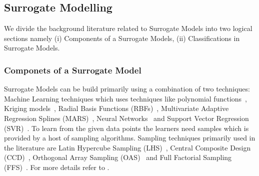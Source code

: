 \documentclass{newsig}
\begin{document}
\subsection{Surrogate Modelling}
We divide the background literature related to Surrogate Models into two logical sections namely (i) Components of a Surrogate Models, (ii) Classifications in Surrogate Models.

\subsubsection{Componets of a Surrogate Model}
Surrogate Models can be build primarily using a combination of two techniques: Machine Learning techniques which uses techniques like polynomial functions~\cite{madsen2000response}, Kriging models~\cite{kleijnen2009kriging}, Radial Basis Functions (RBFs)~\cite{buhmann2004radial}, Multivariate Adaptive Regression Splines (MARS)~\cite{friedman1991multivariate}, Neural Networks~\cite{hagan1996neural} and Support Vector Regression (SVR)~\cite{smola2004tutorial}. To learn from the given data points the learners need samples which is provided by a host of sampling algorithms. Sampling techniques primarily used in the literature are Latin Hypercube Sampling (LHS)~\cite{helton2006survey}, Central Composite Design (CCD)~\cite{jin2001comparative}, Orthogonal Array Sampling (OAS)~\cite{jin2001comparative} and Full Factorial Sampling (FFS)~\cite{jin2001comparative}. For more details refer to \cite{tabatabaei2015survey}.
\end{document}

